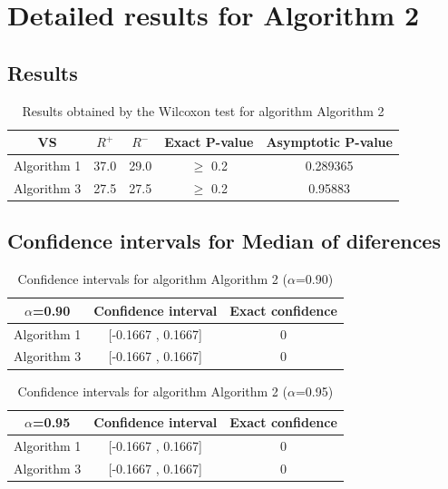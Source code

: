 \documentclass[a4paper,10pt]{article}
\begin{document}
 \clearpage 


\section{Detailed results for Algorithm 2}


\subsection{Results}

\begin{table}[!htp]
\centering\small
\begin{tabular}{
|c|c|c|c|c|}
\hline
 VS & $R^{+}$ & $R^{-}$ & Exact P-value & Asymptotic P-value \\ \hline 
Algorithm 1 & 37.0 & 29.0 & $\geq$ 0.2 & 0.289365\\ \hline 
Algorithm 3 & 27.5 & 27.5 & $\geq$ 0.2 & 0.95883\\ \hline 

\end{tabular}
\caption{Results obtained by the Wilcoxon test for algorithm Algorithm 2}
\end{table}

\subsection{Confidence intervals for Median of diferences}

\begin{table}[!htp]
\centering\small
\begin{tabular}{
|c|c|c|}
\hline
 $\alpha$=0.90 & Confidence interval & Exact confidence \\ \hline 
Algorithm 1 & [-0.1667 , 0.1667] & 0\\ \hline 
Algorithm 3 & [-0.1667 , 0.1667] & 0\\ \hline 

\end{tabular}
\caption{Confidence intervals for algorithm Algorithm 2 ($\alpha$=0.90)}
\end{table}
\begin{table}[!htp]
\centering\small
\begin{tabular}{
|c|c|c|}
\hline
 $\alpha$=0.95 & Confidence interval & Exact confidence \\ \hline 
Algorithm 1 & [-0.1667 , 0.1667] & 0\\ \hline 
Algorithm 3 & [-0.1667 , 0.1667] & 0\\ \hline 

\end{tabular}
\caption{Confidence intervals for algorithm Algorithm 2 ($\alpha$=0.95)}
\end{table}
\end{document}

